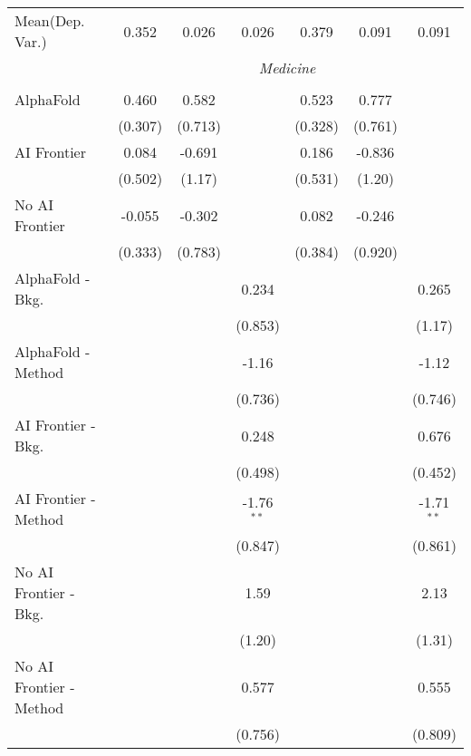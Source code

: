 \begin{tabular}{lcccccc}
Mean(Dep. Var.) & 0.352 & 0.026 & 0.026 & 0.379 & 0.091 & 0.091 \\
 & \multicolumn{6}{c}{\textit{Medicine}} \\ \\
   AlphaFold               & 0.460   & 0.582   &              & 0.523   & 0.777   &   \\   
                           & (0.307) & (0.713) &              & (0.328) & (0.761) &   \\   
   AI Frontier             & 0.084   & -0.691  &              & 0.186   & -0.836  &   \\   
                           & (0.502) & (1.17)  &              & (0.531) & (1.20)  &   \\   
   No AI Frontier          & -0.055  & -0.302  &              & 0.082   & -0.246  &   \\   
                           & (0.333) & (0.783) &              & (0.384) & (0.920) &   \\   
   AlphaFold - Bkg.        &         &         & 0.234        &         &         & 0.265\\   
                           &         &         & (0.853)      &         &         & (1.17)\\   
   AlphaFold - Method      &         &         & -1.16        &         &         & -1.12\\   
                           &         &         & (0.736)      &         &         & (0.746)\\   
   AI Frontier - Bkg.      &         &         & 0.248        &         &         & 0.676\\   
                           &         &         & (0.498)      &         &         & (0.452)\\   
   AI Frontier - Method    &         &         & -1.76$^{**}$ &         &         & -1.71$^{**}$\\   
                           &         &         & (0.847)      &         &         & (0.861)\\   
   No AI Frontier - Bkg.   &         &         & 1.59         &         &         & 2.13\\   
                           &         &         & (1.20)       &         &         & (1.31)\\   
   No AI Frontier - Method &         &         & 0.577        &         &         & 0.555\\   
                           &         &         & (0.756)      &         &         & (0.809)\\   

\end{tabular}
